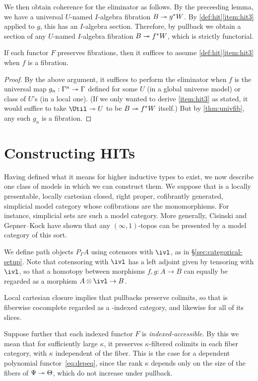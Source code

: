 \documentclass{amsart}
\begin{document}
We then obtain coherence for the eliminator as follows.
By the preceeding lemma, we have a universal $U$-named $I$-algebra fibration $B \twoheadrightarrow g^*W$.
By \autoref{def:hit}\ref{item:hit3} applied to $g$, this has an $I$-algebra section.
Therefore, by pullback we obtain a section of any $U$-named $I$-algebra fibration $B\twoheadrightarrow f^*W$, which is strictly functorial.

\begin{cor}\label{thm:hit3fib}
  If each functor $F$ preserves fibrations, then it suffices to assume \autoref{def:hit}\ref{item:hit3} when $f$ is a fibration.
\end{cor}
\begin{proof}
  By the above argument, it suffices to perform the eliminator when $f$ is the universal map $g_n:\Gamma^n \twoheadrightarrow\Gamma$ defined for some $U$ (in a global universe model) or class of $U$'s (in a local one).
  (If we only wanted to derive \ref{item:hit3} as stated, it would suffice to take $\Util\fib U$ to be $B\twoheadrightarrow f^*W$ itself.)
  But by \autoref{thm:univfib}, any such $g_n$ is a fibration.
\end{proof}


\section{Constructing HITs}
\label{sec:constructing}

Having defined what it means for higher inductive types to exist, we now describe one class of models in which we can construct them.
We suppose that \sC is a locally presentable, locally cartesian closed, right proper, cofibrantly generated, simplicial model category whose cofibrations are the monomorphisms.
For instance, simplicial sets are such a model category.
More generally, Cisinski and Gepner--Kock have shown that any $(\infty,1)$-topos can be presented by a model category of this sort.

We define path objects $P_\Gamma A$ using cotensors with $\ivl$, as in \S\ref{sec:categorical-setup}.
Note that cotensoring with $\ivl$ has a left adjoint given by tensoring with $\ivl$, so that a homotopy between morphisms $f,g:A\to B$ can equally be regarded as a morphism $A\otimes \ivl \to B$.

Local cartesian closure implies that pullbacks preserve colimits, so that \sC is fiberwise cocomplete regarded as a \sC-indexed category, and likewise for all of its slices.

Suppose further that each indexed functor $F$ is \emph{indexed-accessible}.
By this we mean that for sufficiently large $\kappa$, it preserves $\kappa$-filtered colimits in each fiber category, with $\kappa$ independent of the fiber.
This is the case for a dependent polynomial functor~\eqref{eq:depeq}, since the rank $\kappa$ depends only on the size of the fibers of $\Psi\twoheadrightarrow \Theta$, which do not increase under pullback.
\end{document}
